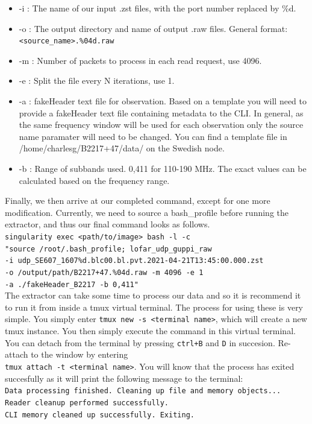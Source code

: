 \documentclass[12pt, onepage]{article}
\numberwithin{equation}{section} %
\begin{document}
\begin{itemize}
    \item -i : The name of our input .zst files, with the port number replaced by \%d.
    \item -o : The output directory and name of output .raw files. General format: \texttt{<source\_name>.\%04d.raw}
    \item -m : Number of packets to process in each read request, use 4096.
    \item -e : Split the file every N iterations, use 1.
    \item -a : fakeHeader text file for observation. Based on a template you will need to provide a fakeHeader text file containing metadata to the CLI. In general, as the same frequency window will be used for each observation only the source name paramater will need to be changed. You can find a template file in /home/charlesg/B2217+47/data/ on the Swedish node.
    \item -b : Range of subbands used. 0,411 for 110-190 MHz. The exact values can be calculated based on the frequency range.
\end{itemize}
Finally, we then arrive at our completed command, except for one more modification. Currently, we need to source a bash\_profile before running the extractor, and thus our final command looks as follows. \\
\texttt{singularity exec <path/to/image>  bash -l -c \\ "source  /root/.bash\_profile;  lofar\_udp\_guppi\_raw \\ -i udp\_SE607\_1607\%d.blc00.bl.pvt.2021-04-21T13:45:00.000.zst \\
-o /output/path/B2217+47.\%04d.raw -m 4096 -e 1 \\ -a ./fakeHeader\_B2217 -b 0,411"}\\
The extractor can take some time to process our data and so it is recommend it to run it from inside a tmux virtual terminal. The process for using these is very simple. You simply enter \texttt{tmux new -s <terminal name>}, which will create a new tmux instance. You then simply execute the command in this virtual terminal. You can detach from the terminal by pressing \texttt{ctrl+B} and \texttt{D} in succesion. Re-attach to the window by entering \\ \texttt{tmux attach -t <terminal name>}. You will know that the process has exited succesfully as it will print the following message to the terminal: \\ \texttt{Data processing finished. Cleaning up file and memory objects...\\
Reader cleanup performed successfully.\\
CLI memory cleaned up successfully. Exiting.
} 
\end{document}
